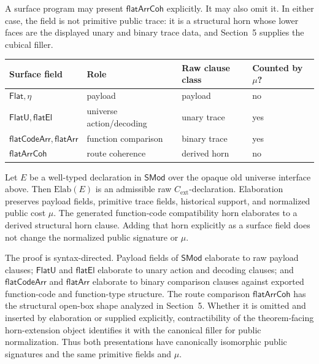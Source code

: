\documentclass{lmcs}
\begin{document}
A surface program may present \(\mathsf{flatArrCoh}\) explicitly.  It may also omit it.  In
either case, the field is not primitive public trace: it is a structural horn whose lower faces
are the displayed unary and binary trace data, and Section~5 supplies the cubical filler.

\begin{center}
\begin{tabular}{llll}
\hline
Surface field & Role & Raw clause class & Counted by \(\mu\)? \\
\hline
\(\mathsf{Flat},\eta\) & payload & payload & no \\
\(\mathsf{FlatU},\mathsf{flatEl}\) & universe action/decoding & unary trace & yes \\
\(\mathsf{flatCodeArr},\mathsf{flatArr}\) & function comparison & binary trace & yes \\
\(\mathsf{flatArrCoh}\) & route coherence & derived horn & no \\
\hline
\end{tabular}
\end{center}

\begin{thm}
Let \(E\) be a well-typed declaration in \(\mathsf{SMod}\) over the opaque old universe
interface above.  Then \(\mathrm{Elab}(E)\) is an admissible raw
\(C_{\mathrm{ext}}\)-declaration.  Elaboration preserves payload fields, primitive trace
fields, historical support, and normalized public cost \(\mu\).  The generated
function-code compatibility horn elaborates to a derived structural horn clause.  Adding
that horn explicitly as a surface field does not change the normalized public signature or
\(\mu\).
\end{thm}

The proof is syntax-directed.  Payload fields of \(\mathsf{SMod}\) elaborate to raw payload
clauses; \(\mathsf{FlatU}\) and \(\mathsf{flatEl}\) elaborate to unary action and decoding
clauses; and \(\mathsf{flatCodeArr}\) and \(\mathsf{flatArr}\) elaborate to binary comparison
clauses against exported function-code and function-type structure.  The route comparison
\(\mathsf{flatArrCoh}\) has the structural open-box shape analyzed in Section~5.  Whether it is
omitted and inserted by elaboration or supplied explicitly, contractibility of the
theorem-facing horn-extension object identifies it with the canonical filler for public
normalization.  Thus both presentations have canonically isomorphic public signatures and the
same primitive fields and \(\mu\).
\end{document}
